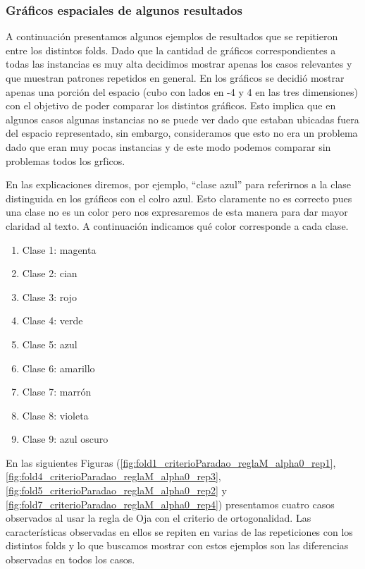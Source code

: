 \documentclass[informe.tex]{subfiles}
\begin{document}
	
      \subsubsection{Gráficos espaciales de algunos resultados}
	A continuación presentamos algunos ejemplos de resultados que se repitieron entre los distintos folds. Dado que la cantidad de gr\'aficos correspondientes a todas las instancias es muy alta decidimos mostrar apenas los casos relevantes y que muestran patrones repetidos en general. En los gráficos se decidió mostrar apenas una porción del espacio (cubo con lados en -4 y 4 en las tres dimensiones) con el objetivo de poder comparar los distintos gr\'aficos. Esto implica que en algunos casos algunas instancias no se puede ver dado que estaban ubicadas fuera del espacio representado, sin embargo, consideramos que esto no era un problema dado que eran muy pocas instancias y de este modo podemos comparar sin problemas todos los gr\'ficos.
	
	En las explicaciones diremos, por ejemplo, ``clase azul'' para referirnos a la clase distinguida en los gráficos con el colro azul. Esto claramente no es correcto pues una clase no es un color pero nos expresaremos de esta manera para dar mayor claridad al texto. A continuación indicamos qué color corresponde a cada clase.
	
	\begin{enumerate}
	  \item Clase 1: magenta
	  \item Clase 2: cian
	  \item Clase 3: rojo
	  \item Clase 4: verde
	  \item Clase 5: azul
	  \item Clase 6: amarillo
	  \item Clase 7: marrón
	  \item Clase 8: violeta
	  \item Clase 9: azul oscuro
	\end{enumerate}

	
	
	
	En las siguientes Figuras (\ref{fig:fold1_criterioParadao_reglaM_alpha0_rep1}, \ref{fig:fold4_criterioParadao_reglaM_alpha0_rep3}, \ref{fig:fold5_criterioParadao_reglaM_alpha0_rep2} y \ref{fig:fold7_criterioParadao_reglaM_alpha0_rep4}) presentamos cuatro casos observados al usar la regla de Oja con el criterio de ortogonalidad. Las características observadas en ellos se repiten en varias de las repeticiones con los distintos folds y lo que buscamos mostrar con estos ejemplos son las diferencias observadas en todos los casos.
	
\end{document}
